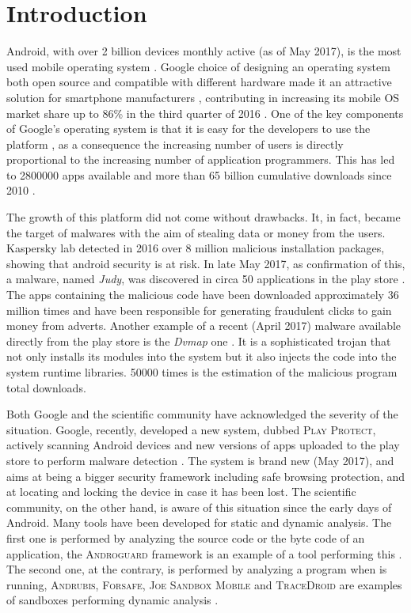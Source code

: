 \chapter{Introduction}
\label{chap:introduction}

Android, with over 2 billion devices monthly active (as of May 2017),
is the most used mobile operating system \cite{ref3}. Google choice of
designing an operating system both open source and compatible with
different hardware made it an attractive solution for smartphone
manufacturers \cite{ref6}, contributing in increasing its mobile OS market
share up to 86\% in the third quarter of 2016 \cite{ref7}. One of the key
components of Google's operating system is that it is easy for the
developers to use the platform \cite{ref6}, as a consequence the increasing
number of users is directly proportional to the increasing number of
application programmers. This has led to \num{2800000} apps available and
more than 65 billion cumulative downloads since 2010 \cite{ref8, ref9}.

The growth of this platform did not come without drawbacks. It, in
fact, became the target of malwares with the aim of stealing data or
money from the users. Kaspersky lab \cite{ref2} detected in 2016 over 8
million malicious installation packages, showing that android security
is at risk. In late May 2017, as confirmation of this, a malware,
named \emph{Judy}, was discovered in circa 50 applications in the play store
\cite{ref5}. The apps containing the malicious code have been downloaded
approximately 36 million times and have been responsible for
generating fraudulent clicks to gain money from adverts. Another
example of a recent (April 2017) malware available directly from the
play store is the \emph{Dvmap} one \cite{ref11}. It is a sophisticated trojan that
not only installs its modules into the system but it also injects the
code into the system runtime libraries. \num{50000} times is the estimation
of the malicious program total downloads.

Both Google and the scientific community have acknowledged the
severity of the situation. Google, recently, developed a new system,
dubbed \textsc{Play Protect}, actively scanning Android devices and new
versions of apps uploaded to the play store to perform malware
detection \cite{ref4}. The system is brand new (May 2017), and aims at being a
bigger security framework including safe browsing protection, and at
locating and locking the device in case it has been lost. The
scientific community, on the other hand, is aware of this situation
since the early days of Android. Many tools have been developed for
static and dynamic analysis. The first one is performed by analyzing
the source code or the byte code of an application, the \textsc{Androguard}
framework is an example of a tool performing this \cite{ref12}. The second
one, at the contrary, is performed by analyzing a program when is
running, \textsc{Andrubis}, \textsc{Forsafe}, \textsc{Joe Sandbox Mobile} and \textsc{TraceDroid} are
examples of sandboxes performing dynamic analysis \cite{ref10}.

